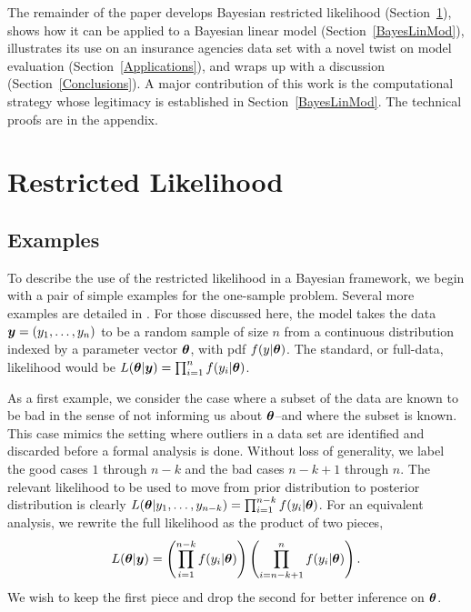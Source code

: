 \documentclass[12pt]{article}
\def\bth{\mbox{\boldmath $\theta$}}
\newcommand{\by}{\mbox{\boldmath $y$}}
\begin{document}
The remainder of the paper develops Bayesian restricted likelihood (Section~\ref{restrictedlikelihood}), shows
how it can be applied to a Bayesian linear model (Section~\ref{BayesLinMod}), illustrates its use
on an insurance agencies data set with a novel twist on model evaluation (Section~\ref{Applications}), 
and wraps up with a discussion (Section~\ref{Conclusions}).  
A major contribution of this work is the computational strategy whose legitimacy is established 
in Section~\ref{BayesLinMod}.  The technical proofs are in the appendix.   

\section{Restricted Likelihood}
\label{restrictedlikelihood}

\subsection{Examples}
To describe the use of the restricted likelihood in a Bayesian framework, 
we begin with a pair of simple examples
for the one-sample problem. Several more examples are detailed in \cite{lewis2014}.  For those discussed here, the model takes the
data $\by=(y_1,\ldots,y_n)$
to be a random sample
of size $n$ from a continuous distribution indexed by a parameter
vector $\bth$, with pdf $f(y| \bth)$.  The standard, or full-data,
likelihood would be $L(\bth | \by) = \prod_{i=1}^n f(y_i | \bth)$.  

As a first example, we consider the case where a subset of the data are known to be 
bad in the sense of not informing us about $\bth$--and where the subset is known.  This case mimics the setting where outliers in
a data set are identified and discarded before a formal analysis is done.  
Without loss of generality, we label the good 
cases $1$ through $n-k$ and the bad 
cases $n-k+1$ through $n$.  
The relevant likelihood to be used to move from prior distribution to posterior distribution is clearly 
$L(\bth | y_1, \ldots, y_{n-k}) = \prod_{i=1}^{n-k} f(y_i | \bth)$.  
For an equivalent analysis, we rewrite the full %
likelihood as the product of two pieces,
\begin{eqnarray}
\label{OutlyingCases}
L(\bth | \by)  
= \left( \prod_{i=1}^{n-k} f(y_i | \bth) \right) \left( \prod_{i=n-k+1}^{n} f(y_i | \bth) \right) .  
\end{eqnarray}
We wish to keep the first piece and drop the second for better inference on $\bth$.
\end{document}
